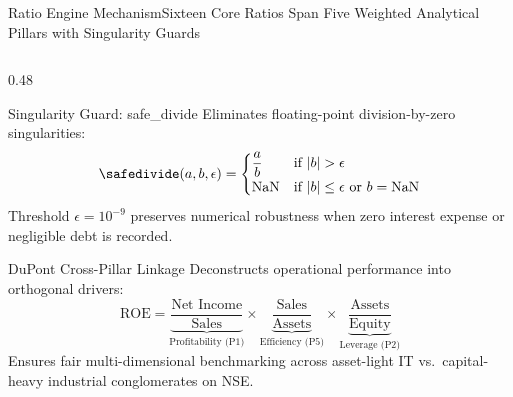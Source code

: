 \begin{frame}{Ratio Engine Mechanism}{Sixteen Core Ratios Span Five Weighted Analytical Pillars with Singularity Guards}
\begin{columns}[T]
        \begin{column}{0.48\textwidth}
            \begin{mathcard}[height=2.7cm]{Singularity Guard: safe\_divide}
                \fontsize{6.3pt}{8pt}\selectfont
                Eliminates floating-point division-by-zero singularities:
                \begin{equation*}
                    \safedivide(a, b, \epsilon) = 
                    \begin{cases} 
                        \dfrac{a}{b} & \text{if } |b| > \epsilon \\[3pt]
                        \text{NaN} & \text{if } |b| \le \epsilon \text{ or } b = \text{NaN}
                    \end{cases}
                \end{equation*}
                Threshold $\epsilon = 10^{-9}$ preserves numerical robustness when zero interest expense or negligible debt is recorded.
            \end{mathcard}

            \vspace{0.1cm}

            \begin{quantcard}[height=2.75cm]{DuPont Cross-Pillar Linkage}
                \fontsize{6.3pt}{8pt}\selectfont
                Deconstructs operational performance into orthogonal drivers:
                \begin{equation*}
                    \text{ROE} = \underbrace{\frac{\text{Net Income}}{\text{Sales}}}_{\text{Profitability (P1)}} \times \underbrace{\frac{\text{Sales}}{\text{Assets}}}_{\text{Efficiency (P5)}} \times \underbrace{\frac{\text{Assets}}{\text{Equity}}}_{\text{Leverage (P2)}}
                \end{equation*}
                Ensures fair multi-dimensional benchmarking across asset-light IT vs.\ capital-heavy industrial conglomerates on NSE.
            \end{quantcard}
        \end{column}
    \end{columns}

    \vspace{0.1cm}
    \hfill {}
\end{frame}
